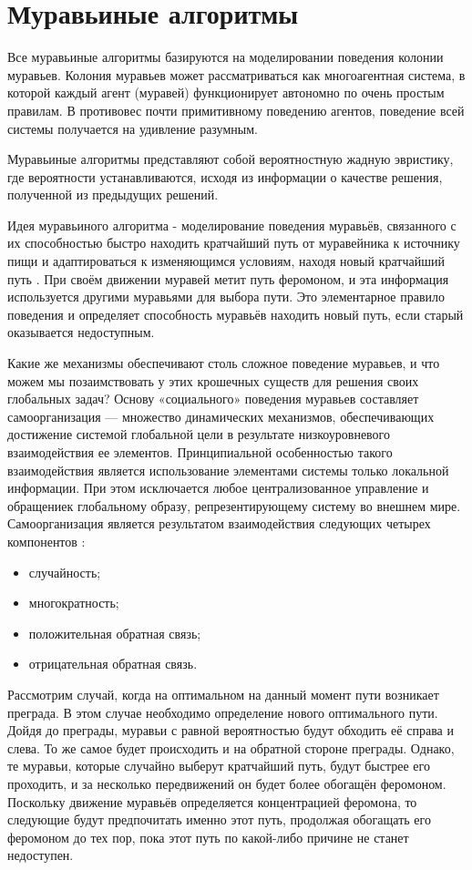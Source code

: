 \documentclass[12pt]{report}
\begin{document}
\section{Муравьиные алгоритмы}
Все муравьиные алгоритмы базируются на моделировании поведения колонии муравьев. Колония муравьев может рассматриваться как многоагентная система, в которой каждый агент (муравей) функционирует автономно по очень простым правилам. В противовес почти примитивному поведению агентов, поведение всей системы получается на удивление разумным.
		
Муравьиные алгоритмы представляют собой вероятностную жадную эвристику, где вероятности устанавливаются, исходя из информации о качестве решения, полученной из предыдущих решений.

Идея муравьиного алгоритма - моделирование поведения муравьёв, связанного с их способностью быстро находить кратчайший путь от муравейника к источнику пищи и адаптироваться к изменяющимся условиям, находя новый кратчайший путь \cite{shtovba}. При своём движении муравей метит путь феромоном, и эта информация используется другими муравьями для выбора пути. Это элементарное правило поведения и определяет способность муравьёв находить новый путь, если старый оказывается недоступным.

Какие же механизмы обеспечивают столь сложное поведение муравьев, и что можем мы позаимствовать у этих крошечных существ для решения своих глобальных задач? Основу «социального» поведения муравьев составляет самоорганизация — множество динамических механизмов, обеспечивающих достижение системой глобальной цели в результате низкоуровневого взаимодействия ее элементов. Принципиальной особенностью такого взаимодействия является использование элементами системы только локальной информации. При этом исключается любое централизованное управление и обращениек глобальному образу, репрезентирующему систему во внешнем мире. Самоорганизация является результатом взаимодействия следующих четырех компонентов \cite{shtovba} :

\begin{itemize}
	\item случайность;
	\item многократность;
	\item положительная обратная связь;
	\item отрицательная обратная связь.
\end{itemize}

Рассмотрим случай, когда на оптимальном на данный момент пути возникает преграда. В этом случае необходимо определение нового оптимального пути. Дойдя до преграды, муравьи с равной вероятностью будут обходить её справа и слева. То же самое будет происходить и на обратной стороне преграды. Однако, те муравьи, которые случайно выберут кратчайший путь, будут быстрее его проходить, и за несколько передвижений он будет более обогащён феромоном. Поскольку движение муравьёв определяется концентрацией феромона, то следующие будут предпочитать именно этот путь, продолжая обогащать его феромоном до тех пор, пока этот путь по какой-либо причине не станет недоступен.
\end{document}
